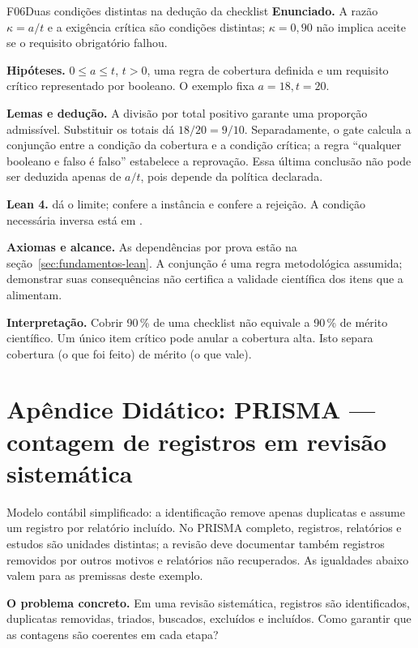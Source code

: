 \begin{formalizacao}{F06}{Duas condições distintas na dedução da checklist}
\textbf{Enunciado.} A razão $\kappa=a/t$ e a exigência crítica são condições distintas; $\kappa=0{,}90$ não implica aceite se o requisito obrigatório falhou.

\textbf{Hipóteses.} $0\leq a\leq t$, $t>0$, uma regra de cobertura definida e um requisito crítico representado por booleano. O exemplo fixa $a=18,t=20$.

\textbf{Lemas e dedução.} A divisão por total positivo garante uma proporção admissível. Substituir os totais dá $18/20=9/10$. Separadamente, o gate calcula a conjunção entre a condição da cobertura e a condição crítica; a regra ``qualquer booleano e falso é falso'' estabelece a reprovação. Essa última conclusão não pode ser deduzida apenas de $a/t$, pois depende da política declarada.

\textbf{Lean 4.}  dá o limite;  confere a instância e  confere a rejeição. A condição necessária inversa está em .

\textbf{Axiomas e alcance.} As dependências por prova estão na seção~\ref{sec:fundamentos-lean}. A conjunção é uma regra metodológica assumida; demonstrar suas consequências não certifica a validade científica dos itens que a alimentam.
\end{formalizacao}

\begin{descricao}
\textbf{Interpretação.} Cobrir 90\,\% de uma checklist não equivale a 90\,\% de mérito científico. Um único item crítico pode anular a cobertura alta. Isto separa cobertura (o que foi feito) de mérito (o que vale).
\end{descricao}

\clearpage
\section{Apêndice Didático: PRISMA — contagem de registros em revisão sistemática}


\begin{descricao}
Modelo contábil simplificado: a identificação remove apenas duplicatas e assume um registro por relatório incluído. No PRISMA completo, registros, relatórios e estudos são unidades distintas; a revisão deve documentar também registros removidos por outros motivos e relatórios não recuperados. As igualdades abaixo valem para as premissas deste exemplo.

\textbf{O problema concreto.} Em uma revisão sistemática, registros são identificados, duplicatas removidas, triados, buscados, excluídos e incluídos. Como garantir que as contagens são coerentes em cada etapa?
\end{descricao}


